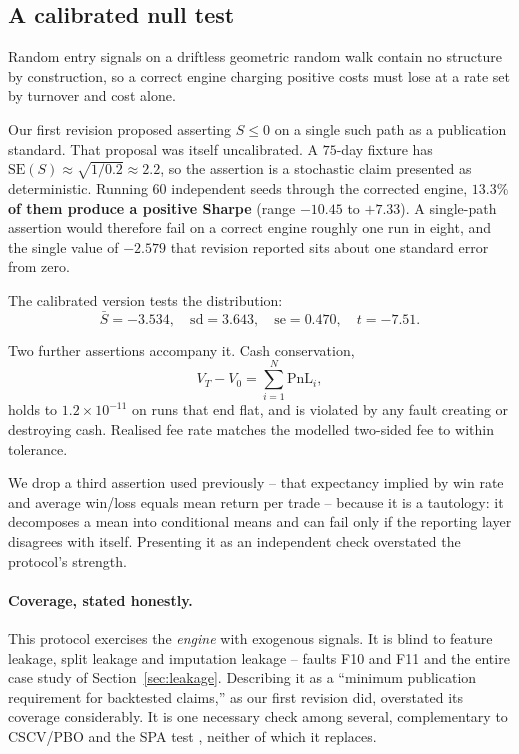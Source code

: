 \documentclass[preprint,12pt,authoryear]{elsarticle}
\begin{document}
\subsection{A calibrated null test}
\label{ssec:null}

Random entry signals on a driftless geometric random walk contain no structure by
construction, so a correct engine charging positive costs must lose at a rate set
by turnover and cost alone.

Our first revision proposed asserting $S \le 0$ on a single such path as a
publication standard. That proposal was itself uncalibrated. A $75$-day fixture
has $\mathrm{SE}(S) \approx \sqrt{1/0.2} \approx 2.2$, so the assertion is a
stochastic claim presented as deterministic. Running $60$ independent seeds
through the corrected engine, \textbf{$13.3\%$ of them produce a positive Sharpe}
(range $-10.45$ to $+7.33$). A single-path assertion would therefore fail on a
correct engine roughly one run in eight, and the single value of $-2.579$ that
revision reported sits about one standard error from zero.

The calibrated version tests the distribution:
\begin{equation}
\bar{S} = -3.534, \quad \mathrm{sd} = 3.643, \quad \mathrm{se} = 0.470,
\quad t = -7.51 .
\end{equation}

Two further assertions accompany it. Cash conservation,
\begin{equation}
V_T - V_0 = \sum_{i=1}^{N} \mathrm{PnL}_i ,
\label{eq:reconcile}
\end{equation}
holds to $1.2 \times 10^{-11}$ on runs that end flat, and is violated by any
fault creating or destroying cash. Realised fee rate matches the modelled
two-sided fee to within tolerance.

We drop a third assertion used previously -- that expectancy implied by win rate
and average win/loss equals mean return per trade -- because it is a tautology:
it decomposes a mean into conditional means and can fail only if the reporting
layer disagrees with itself. Presenting it as an independent check overstated the
protocol's strength.

\paragraph{Coverage, stated honestly.} This protocol exercises the \emph{engine}
with exogenous signals. It is blind to feature leakage, split leakage and
imputation leakage -- faults F10 and F11 and the entire case study of
Section~\ref{sec:leakage}. Describing it as a ``minimum publication requirement
for backtested claims,'' as our first revision did, overstated its coverage
considerably. It is one necessary check among several, complementary to
CSCV/PBO \citep{bailey2014deflated} and the SPA test \citep{hansen2005test},
neither of which it replaces.
\end{document}

